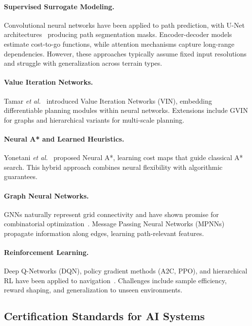 \documentclass{article}
\providecommand{\etal}{\textit{et al.}}
\begin{document}
\paragraph{Supervised Surrogate Modeling.}
Convolutional neural networks have been applied to path prediction, with U-Net architectures~\cite{ronneberger2015unet} producing path segmentation masks. Encoder-decoder models estimate cost-to-go functions, while attention mechanisms capture long-range dependencies. However, these approaches typically assume fixed input resolutions and struggle with generalization across terrain types.

\paragraph{Value Iteration Networks.}
Tamar \etal~\cite{tamar2016vin} introduced Value Iteration Networks (VIN), embedding differentiable planning modules within neural networks. Extensions include GVIN for graphs and hierarchical variants for multi-scale planning.

\paragraph{Neural A* and Learned Heuristics.}
Yonetani \etal~\cite{yonetani2021neural} proposed Neural A*, learning cost maps that guide classical A* search. This hybrid approach combines neural flexibility with algorithmic guarantees.

\paragraph{Graph Neural Networks.}
GNNs naturally represent grid connectivity and have shown promise for combinatorial optimization~\cite{cappart2021combinatorial}. Message Passing Neural Networks (MPNNs) propagate information along edges, learning path-relevant features.

\paragraph{Reinforcement Learning.}
Deep Q-Networks (DQN), policy gradient methods (A2C, PPO), and hierarchical RL have been applied to navigation~\cite{mirowski2017learning}. Challenges include sample efficiency, reward shaping, and generalization to unseen environments.

\subsection{Certification Standards for AI Systems}
\end{document}
